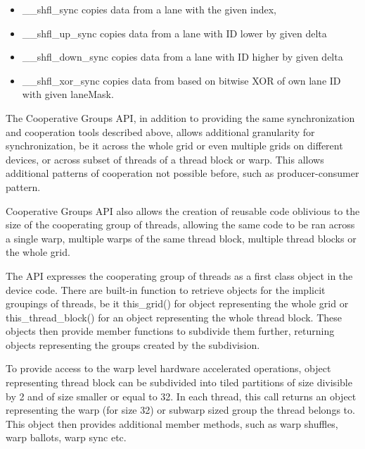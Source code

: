 \begin{itemize}
	\item \_\_shfl\_sync copies data from a lane with the given index,
	\item \_\_shfl\_up\_sync copies data from a lane with ID lower by given delta
	\item \_\_shfl\_down\_sync copies data from a lane with ID higher by given delta
	\item \_\_shfl\_xor\_sync copies data from based on bitwise XOR of own lane ID with given laneMask.
\end{itemize}




The Cooperative Groups API, in addition to providing the same synchronization and cooperation tools described above, allows additional granularity for synchronization, be it across the whole grid or even multiple grids on different devices, or across subset of threads of a thread block or warp. This allows additional patterns of cooperation not possible before, such as producer-consumer pattern.

Cooperative Groups API also allows the creation of reusable code oblivious to the size of the cooperating group of threads, allowing the same code to be ran across a single warp, multiple warps of the same thread block, multiple thread blocks or the whole grid.

The API expresses the cooperating group of threads as a first class object in the device code. There are built-in function to retrieve objects for the implicit groupings of threads, be it this\_grid() for object representing the whole grid or this\_thread\_block() for an object representing the whole thread block. These objects then provide member functions to subdivide them further, returning objects representing the groups created by the subdivision.


To provide access to the warp level hardware accelerated operations, object representing thread block can be subdivided into tiled partitions of size divisible by 2 and of size smaller or equal to 32. In each thread, this call returns an object representing the warp (for size 32) or subwarp sized group the thread belongs to. This object then provides additional member methods, such as warp shuffles, warp ballots, warp sync etc.


